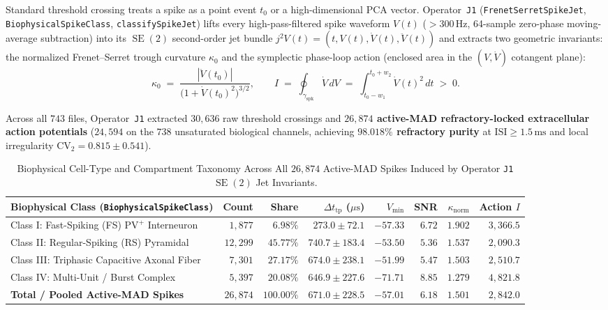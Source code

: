 \documentclass[11pt,letterpaper]{article}
\newcommand{\lean}[1]{\nolinkurl{#1}}
\theoremstyle{definition}
\begin{document}
Standard threshold crossing treats a spike as a point event $t_0$ or a high-dimensional PCA vector. Operator~\texttt{J1} (\lean{FrenetSerretSpikeJet}, \lean{BiophysicalSpikeClass}, \lean{classifySpikeJet}) lifts every high-pass-filtered spike waveform $V(t)$ ($> 300\,\text{Hz}$, 64-sample zero-phase moving-average subtraction) into its $\operatorname{SE}(2)$ second-order jet bundle $j^2 V(t) = (t, V(t), \dot{V}(t), \ddot{V}(t))$ and extracts two geometric invariants: the normalized Frenet--Serret trough curvature $\kappa_0$ and the symplectic phase-loop action (enclosed area in the $(V, \dot{V})$ cotangent plane):
\begin{equation}\label{eq:frenet_symplectic}
  \kappa_0 \;=\; \frac{|\ddot{V}(t_0)|}{\bigl(1 + \dot{V}(t_0)^2\bigr)^{3/2}}, \qquad
  I \;=\; \oint_{\gamma_{\mathrm{spk}}} \dot{V}\,dV \;=\; \int_{t_0 - w_1}^{t_0 + w_2} \dot{V}(t)^2\,dt \;>\; 0.
\end{equation}

Across all $743$ files, Operator~\texttt{J1} extracted $30{,}636$ raw threshold crossings and \textbf{$26{,}874$ active-MAD refractory-locked extracellular action potentials} ($24{,}594$ on the $738$ unsaturated biological channels, achieving \textbf{$98.018\%$ refractory purity} at $\mathrm{ISI} \ge 1.5\,\text{ms}$ and local irregularity $\mathrm{CV}_2 = 0.815 \pm 0.541$).

\begin{table}[htbp]
\centering
\caption{Biophysical Cell-Type and Compartment Taxonomy Across All $26{,}874$ Active-MAD Spikes Induced by Operator \texttt{J1} $\operatorname{SE}(2)$ Jet Invariants.}
\label{tab:cell_taxonomy}
\footnotesize
\setlength{\tabcolsep}{3.5pt}
\begin{tabular}{@{}lrrrrrrr@{}}
\toprule
\textbf{Biophysical Class (\lean{BiophysicalSpikeClass})} & \textbf{Count} & \textbf{Share} & \textbf{$\Delta t_{\mathrm{tp}}$ ($\mu\text{s}$)} & \textbf{$V_{\min}$} & \textbf{SNR} & \textbf{$\kappa_{\mathrm{norm}}$} & \textbf{Action $I$} \\
\midrule
Class I: Fast-Spiking (FS) $\text{PV}^+$ Interneuron & $1{,}877$ & $6.98\%$ & $273.0 \pm 72.1$ & $-57.33$ & $6.72$ & $1.902$ & $3{,}366.5$ \\
Class II: Regular-Spiking (RS) Pyramidal & $12{,}299$ & $45.77\%$ & $740.7 \pm 183.4$ & $-53.50$ & $5.36$ & $1.537$ & $2{,}090.3$ \\
Class III: Triphasic Capacitive Axonal Fiber & $7{,}301$ & $27.17\%$ & $674.0 \pm 238.1$ & $-51.99$ & $5.47$ & $1.503$ & $2{,}510.7$ \\
Class IV: Multi-Unit / Burst Complex & $5{,}397$ & $20.08\%$ & $646.9 \pm 227.6$ & $-71.71$ & $8.85$ & $1.279$ & $4{,}821.8$ \\
\midrule
\textbf{Total / Pooled Active-MAD Spikes} & \textbf{$26{,}874$} & \textbf{$100.00\%$} & \textbf{$671.0 \pm 228.5$} & \textbf{$-57.01$} & \textbf{$6.18$} & \textbf{$1.501$} & \textbf{$2{,}842.0$} \\
\bottomrule
\end{tabular}
\end{table}
\end{document}
